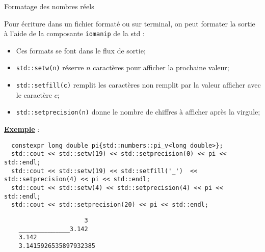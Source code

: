 \documentclass[compress,10pt,aspectratio=169]{beamer}
\begin{document}
\begin{frame}[fragile]{Formatage des nombres réels}
  \scriptsize 
  
  Pour écriture dans un fichier formaté ou sur terminal, on peut formater la sortie à l'aide de la composante \texttt{iomanip} de la std :
  \begin{itemize}
  \item Ces formats se font dans le flux de sortie;
  \item \texttt{std::setw(n)} réserve $n$ caractères pour afficher la prochaine valeur;
  \item \texttt{std::setfill(c)} remplit les caractères non remplit par la valeur afficher avec le caractère $c$;
  \item \texttt{std::setprecision(n)} donne le nombre de chiffres à afficher après la virgule;
  \end{itemize}
  
  \underline{\textbf{Exemple}} :
  \begin{verbatim}
  constexpr long double pi{std::numbers::pi_v<long double>};
  std::cout << std::setw(19) << std::setprecision(0) << pi << std::endl;
  std::cout << std::setw(19) << std::setfill('_')  << std::setprecision(4) << pi << std::endl;
  std::cout << std::setw(4) << std::setprecision(4) << pi << std::endl;
  std::cout << std::setprecision(20) << pi << std::endl;
  \end{verbatim}
  
\begin{tcolorbox}[colback=black,coltext=white]
\begin{verbatim}
                      3
    ______________3.142
    3.142
    3.1415926535897932385\end{verbatim}
\end{tcolorbox}
\end{frame}
\end{document}
